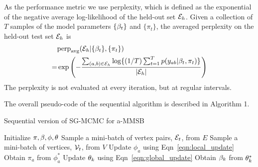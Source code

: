 As the performance metric we use perplexity, which is defined as the exponential
of the negative average log-likelihood of the held-out set $\cE_h$. Given a collection of $T$
samples of the model parameters $\{\beta_t\}$ and $\{\pi_t\}$, the averaged
perplexity on the held-out test set $\cE_h$ is 
\begin{align}
&\text{perp}_{\text{avg}}(\cE_h|\{\beta_t\},\{\pi_t\})\nonumber \\=&
\exp\left(-\frac{\sum_{(a,b)\in \cE_h}^{}\log
\{(1/T)\sm{t}{T}p(y_{ab}|\beta_t,\pi_t)\}}{|\cE_{h}|}\right)
\end{align}
The perplexity is not evaluated at every iteration, but at regular intervals.

The overall pseudo-code of the sequential algorithm is described in Algorithm 1. 

\begin{algorithm}[t]
\caption{Sequential version of SG-MCMC for a-MMSB}\label{alg}
\begin{algorithmic}[1]
\STATE Initialize $\pi , \beta, \phi, \theta$
\STATE Sample a mini-batch of vertex pairs, $\cE_t$, from $E$
	\STATE Sample a mini-batch of vertices, $\cV_t$, from $V$
    \STATE Update $\phi_{a}$ using Eqn~\ref{eqn:local_update}
    \STATE Obtain $\pi_a$ from $\phi_a^*$ \ENDFOR
{}
    \STATE Update $\theta_{k}$ using Eqn~\ref{eqn:global_update}
    \STATE Obtain $\beta_k$ from $\theta_k^*$
\ENDFOR
\ENDWHILE
\end{algorithmic}
\end{algorithm}


